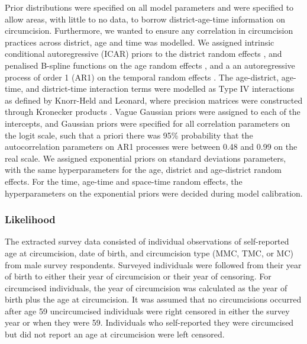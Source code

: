 \documentclass{article}
\begin{document}
Prior distributions were specified on all model parameters and were specified to allow areas, with little to no data, to borrow district-age-time information on circumcision. Furthermore, we wanted to ensure any correlation in circumcision practices across district, age and time was modelled. We assigned intrinsic conditional autoregressive (ICAR) priors to the district random effects \cite{besag1995conditional}, and penalised B-spline functions on the age random effects \cite{wood2017generalized}, and a an autoregressive process of order 1 (AR1) on the temporal random effects \cite{shumway2000time}. The age-district, age-time, and district-time interaction terms were modelled as Type IV interactions as defined by Knorr-Held and Leonard, where precision matrices were constructed through Kronecker products \cite{knorr2000bayesian}. Vague Gaussian priors were assigned to each of the intercepts, and Gaussian priors were specified for all correlation parameters on the logit scale, such that a priori there was 95\% probability that the autocorrelation parameters on AR1 processes were between 0.48 and 0.99 on the real scale. We assigned exponential priors on standard deviations parameters, with the same hyperparameters for the age, district and age-district random effects. For the time, age-time and space-time random effects, the hyperparameters on the exponential priors were decided during model calibration. 


\subsubsection*{Likelihood}


The extracted survey data consisted of individual observations of self-reported age at circumcision, date of birth, and circumcision type (MMC, TMC, or MC) from male survey respondents. Surveyed individuals were followed from their year of birth to either their year of circumcision or their year of censoring. For circumcised individuals, the year of circumcision was calculated as the year of birth plus the age at circumcision. It was assumed that no circumcisions occurred after age 59  uncircumcised individuals were right censored in either the survey year or when they were 59. Individuals who self-reported they were circumcised but did not report an age at circumcision were left censored. 
\end{document}
